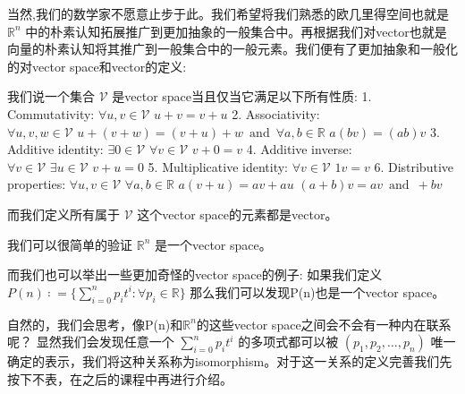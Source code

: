 \documentclass{ctexart}
\begin{document}
当然,我们的数学家不愿意止步于此。我们希望将我们熟悉的欧几里得空间也就是 $\mathbb{R}^n$ 中的朴素认知拓展推广到更加抽象的一般集合中。再根据我们对vector也就是向量的朴素认知将其推广到一般集合中的一般元素。我们便有了更加抽象和一般化的对vector space和vector的定义:

我们说一个集合 $ \mathcal{V} $ 是vector space当且仅当它满足以下所有性质:
	1. Commutativity:  $\forall  u,v\in \mathcal{V} \,\, u+v=v+u$ 
	2. Associativity: $ \forall  u,v,w \in \mathcal{V} \,\, u+(v+w)=(v+u)+w \,\,\, \text{and} \,\,\, \forall  a,b\in \mathbb{R} \,\, a(bv)=(ab)v $ 
	3. Additive identity: $ \exists 0\in \mathcal{V} \,\, \forall  v\in \mathcal{V} \,\, v+0=v $ 
	4. Additive inverse: $ \forall  v\in \mathcal{V} \,\, \exists  u\in \mathcal{V} \,\, v+u=0 $ 
	5. Multiplicative identity: $ \forall  v\in \mathcal{V} \,\, 1v=v $ 
	6. Distributive properties: $ \forall  u,v\in \mathcal{V} \,\, \forall  a,b\in \mathbb{R} \,\,  a(v+u)=av+au \,\, (a+b)v=av \,\,\,  \text{and} \,\,\,  +bv $ 

而我们定义所有属于 $ \mathcal{V} $ 这个vector space的元素都是vector。

我们可以很简单的验证 $ \mathbb{R}^n $ 是一个vector space。

而我们也可以举出一些更加奇怪的vector space的例子:
如果我们定义 $ P(n) ∶=\{ \sum_{i=0}^n p_i t^i :\forall p_i\in \mathbb{R}\} $  那么我们可以发现P(n)也是一个vector space。

自然的，我们会思考，像P(n)和$\mathbb{R}^n$的这些vector space之间会不会有一种内在联系呢？
显然我们会发现任意一个 $ \sum_{i=0}^n p_i t^i $ 的多项式都可以被 $ (p_1,p_2,…,p_n) $ 唯一确定的表示，我们将这种关系称为isomorphism。对于这一关系的定义完善我们先按下不表，在之后的课程中再进行介绍。
\end{document}
